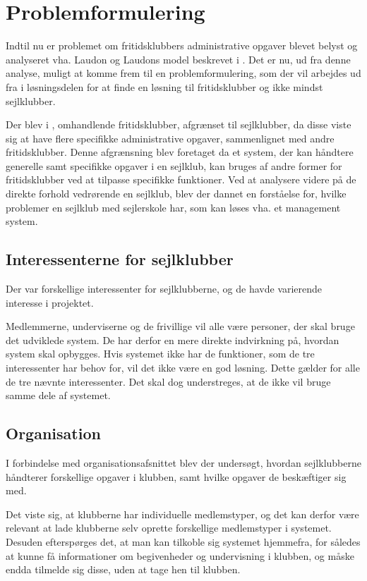 \chapter{Problemformulering}\label{chap:problemformulering-new}

Indtil nu er problemet om fritidsklubbers administrative opgaver blevet belyst og analyseret vha. Laudon og Laudons model beskrevet i . 
Det er nu, ud fra denne analyse, muligt at komme frem til en problemformulering, som der vil arbejdes ud fra i løsningsdelen for at finde en løsning til fritidsklubber og ikke mindst sejlklubber.

Der blev i , omhandlende fritidsklubber, afgrænset til sejlklubber, da disse viste sig at have flere specifikke administrative opgaver, sammenlignet med andre fritidsklubber. 
Denne afgrænsning blev foretaget da et system, der kan håndtere generelle samt specifikke opgaver i en sejlklub, kan bruges af andre former for fritidsklubber ved at tilpasse specifikke funktioner.
Ved at analysere videre på de direkte forhold vedrørende en sejlklub, blev der dannet en forståelse for, hvilke problemer en sejlklub med sejlerskole har, som kan løses vha. et management system.


\section{Interessenterne for sejlklubber}

Der var forskellige interessenter for sejlklubberne, og de havde varierende interesse i projektet. 

Medlemmerne, underviserne og de frivillige vil alle være personer, der skal bruge det udviklede system. 
De har derfor en mere direkte indvirkning på, hvordan system skal opbygges. 
Hvis systemet ikke har de funktioner, som de tre interessenter har behov for, vil det ikke være en god løsning.
Dette gælder for alle de tre nævnte interessenter. 
Det skal dog understreges, at de ikke vil bruge samme dele af systemet. 

\section{Organisation}

I forbindelse med organisationsafsnittet blev der undersøgt, hvordan sejlklubberne håndterer forskellige opgaver i klubben, samt hvilke opgaver de beskæftiger sig med.

Det viste sig, at klubberne har individuelle medlemstyper, og det kan derfor være relevant at lade klubberne selv oprette forskellige medlemstyper i systemet. 
Desuden efterspørges det, at man kan tilkoble sig systemet hjemmefra, for således at kunne få informationer om begivenheder og undervisning i klubben, og måske endda tilmelde sig disse, uden at tage hen til klubben.

